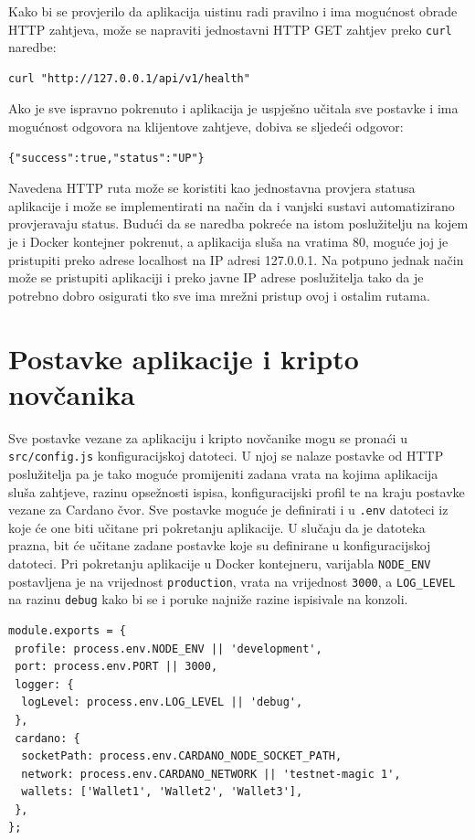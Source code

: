 \documentclass[times, utf8, diplomski]{fer}
\begin{document}
Kako bi se provjerilo da aplikacija uistinu radi pravilno i ima mogućnost obrade HTTP zahtjeva, može se napraviti jednostavni HTTP GET zahtjev preko \texttt{curl} naredbe:

\begin{verbatim}
curl "http://127.0.0.1/api/v1/health"
\end{verbatim}

Ako je sve ispravno pokrenuto i aplikacija je uspješno učitala sve postavke i ima mogućnost odgovora na klijentove zahtjeve, dobiva se sljedeći odgovor:

\begin{verbatim}
{"success":true,"status":"UP"}
\end{verbatim}

Navedena HTTP ruta može se koristiti kao jednostavna provjera statusa aplikacije i može se implementirati na način da i vanjski sustavi automatizirano provjeravaju status. Budući da se naredba pokreće na istom poslužitelju na kojem je i Docker kontejner pokrenut, a aplikacija sluša na vratima 80, moguće joj je pristupiti preko adrese localhost na IP adresi 127.0.0.1. Na potpuno jednak način može se pristupiti aplikaciji i preko javne IP adrese poslužitelja tako da je potrebno dobro osigurati tko sve ima mrežni pristup ovoj i ostalim rutama.

\section{Postavke aplikacije i kripto novčanika}

Sve postavke vezane za aplikaciju i kripto novčanike mogu se pronaći u \texttt{src/config.js} konfiguracijskoj datoteci. U njoj se nalaze postavke od HTTP poslužitelja pa je tako moguće promijeniti zadana vrata na kojima aplikacija sluša zahtjeve, razinu opsežnosti ispisa, konfiguracijski profil te na kraju postavke vezane za Cardano čvor. Sve postavke moguće je definirati i u \texttt{.env} datoteci iz koje će one biti učitane pri pokretanju aplikacije. U slučaju da je datoteka prazna, bit će učitane zadane postavke koje su definirane u konfiguracijskoj datoteci. Pri pokretanju aplikacije u Docker kontejneru, varijabla \texttt{NODE\_ENV} postavljena je na vrijednost \texttt{production}, vrata na vrijednost \texttt{3000}, a \texttt{LOG\_LEVEL} na razinu \texttt{debug} kako bi se i poruke najniže razine ispisivale na konzoli.

\begin{lstlisting}
module.exports = {
 profile: process.env.NODE_ENV || 'development',
 port: process.env.PORT || 3000,
 logger: {
  logLevel: process.env.LOG_LEVEL || 'debug',
 },
 cardano: {
  socketPath: process.env.CARDANO_NODE_SOCKET_PATH,
  network: process.env.CARDANO_NETWORK || 'testnet-magic 1',
  wallets: ['Wallet1', 'Wallet2', 'Wallet3'],
 },
};
\end{lstlisting}
\end{document}
